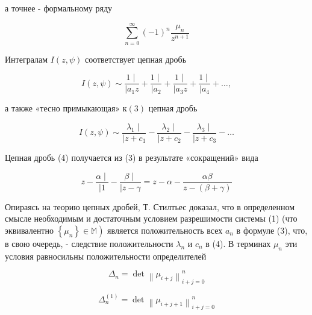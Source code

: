 \documentclass[10pt]{article}
\begin{document}
а точнее - формальному ряду



\[

\sum_{n=0}^{\infty}(-1)^{n} \frac{\mu_{n}}{z^{n+1}}

\]



Интегралам $I(z, \psi)$ соответствует цепная дробь



\[

I(z, \psi) \sim \frac{1 \mid}{\mid a_{1} z}+\frac{1 \mid}{\mid a_{2}}+\frac{1 \mid}{\mid a_{3} z}+\frac{1 \mid}{\mid a_{4}}+\ldots,

\]



а также «тесно примыкающая» $к(3)$ цепная дробь



\[

I(z, \psi) \sim \frac{\lambda_{1} \mid}{\mid z+c_{1}}-\frac{\lambda_{2} \mid}{\mid z+c_{2}}-\frac{\lambda_{3} \mid}{\mid z+c_{3}}-\ldots

\]



Цепная дробь (4) получается из (3) в результате «сокращений» вида



\[

z-\frac{\alpha \mid}{\mid 1}-\frac{\beta \mid}{\mid z-\gamma}=z-\alpha-\frac{\alpha \beta}{z-(\beta+\gamma)}

\]



Опираясь на теорию цепных дробей, Т. Стилтьес доказал, что в определенном смысле необходимым и достаточным условием разрешимости системы (1) (что эквивалентно $\left.\left\{\mu_{n}\right\} \in \mathbb{M}\right)$ является положительность всех $a_{n}$ в формуле (3), что, в свою очередь, - следствие положительности $\lambda_{n}$ и $c_{n}$ в (4). В терминах $\mu_{n}$ эти условия равносильны положительности определителей



\[

\Delta_{n}=\operatorname{det}\left\|\mu_{i+j}\right\|_{i+j=0}^{n}

\]



\[

\Delta_{n}^{(1)}=\operatorname{det}\left\|\mu_{i+j+1}\right\|_{i+j=0}^{n}

\]
\end{document}
